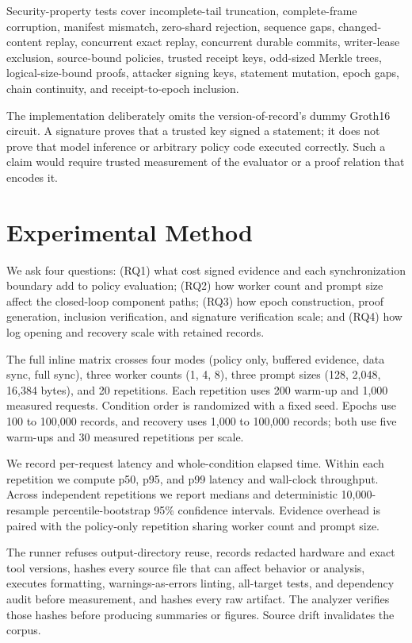 \documentclass[10pt,twocolumn]{article}
\begin{document}
Security-property tests cover incomplete-tail truncation, complete-frame corruption, manifest mismatch, zero-shard rejection, sequence gaps, changed-content replay, concurrent exact replay, concurrent durable commits, writer-lease exclusion, source-bound policies, trusted receipt keys, odd-sized Merkle trees, logical-size-bound proofs, attacker signing keys, statement mutation, epoch gaps, chain continuity, and receipt-to-epoch inclusion.

The implementation deliberately omits the version-of-record's dummy Groth16 circuit. A signature proves that a trusted key signed a statement; it does not prove that model inference or arbitrary policy code executed correctly. Such a claim would require trusted measurement of the evaluator or a proof relation that encodes it.

\section{Experimental Method}
We ask four questions: (RQ1) what cost signed evidence and each synchronization boundary add to policy evaluation; (RQ2) how worker count and prompt size affect the closed-loop component paths; (RQ3) how epoch construction, proof generation, inclusion verification, and signature verification scale; and (RQ4) how log opening and recovery scale with retained records.

The full inline matrix crosses four modes (policy only, buffered evidence, data sync, full sync), three worker counts (1, 4, 8), three prompt sizes (128, 2,048, 16,384 bytes), and 20 repetitions. Each repetition uses 200 warm-up and 1,000 measured requests. Condition order is randomized with a fixed seed. Epochs use 100 to 100,000 records, and recovery uses 1,000 to 100,000 records; both use five warm-ups and 30 measured repetitions per scale.

We record per-request latency and whole-condition elapsed time. Within each repetition we compute p50, p95, and p99 latency and wall-clock throughput. Across independent repetitions we report medians and deterministic 10,000-resample percentile-bootstrap 95\% confidence intervals. Evidence overhead is paired with the policy-only repetition sharing worker count and prompt size.

The runner refuses output-directory reuse, records redacted hardware and exact tool versions, hashes every source file that can affect behavior or analysis, executes formatting, warnings-as-errors linting, all-target tests, and dependency audit before measurement, and hashes every raw artifact. The analyzer verifies those hashes before producing summaries or figures. Source drift invalidates the corpus.
\end{document}
